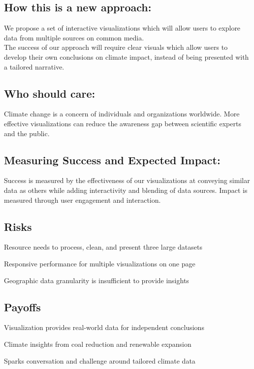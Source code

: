 \documentclass[sigconf,nonacm=true]{acmart}
\newenvironment{my_itemize}{
	\begin{itemize}
		\setlength{\itemsep}{1pt}
		\setlength{\parskip}{0pt}
		\setlength{\parsep}{0pt}}
	{\end{itemize}
}
\begin{document}
\subsection{How this is a new approach:}
We propose a set of interactive visualizations which will allow users to explore data from multiple sources on common media. \\

The success of our approach will require clear visuals which allow users to develop their own conclusions on climate impact, instead of being presented with a tailored narrative.  
\subsection{Who should care:} 
Climate change is a concern of individuals and organizations worldwide. More effective visualizations can reduce the awareness gap between scientific experts and the public.

\subsection{Measuring Success and Expected Impact:}
Success is measured by the effectiveness of our visualizations at conveying similar data as others while adding interactivity and blending of data sources. Impact is measured through user engagement and interaction.
\subsection{Risks}
\begin{my_itemize}
	\item Resource needs to process, clean, and present three large datasets
	\item Responsive performance for multiple visualizations on one page
	\item Geographic data granularity is insufficient to provide insights
\end{my_itemize}
\subsection{Payoffs}
\begin{my_itemize}
	\item Visualization provides real-world data for independent conclusions
	\item Climate insights from coal reduction and renewable expansion
	\item Sparks conversation and challenge around tailored climate data
\end{my_itemize}
\end{document}
